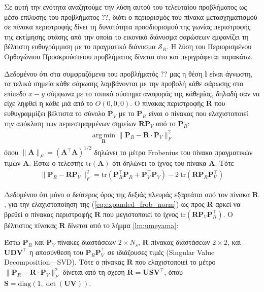 Σε αυτή την ενότητα αναζητούμε την λύση αυτού του τελευταίου προβλήματος ως
μέσο επίλυσης του προβλήματος ??, διότι ο περιορισμός του πίνακα
μετασχηματισμού σε πίνακα περιστροφής δίνει τη δυνατότητα προσδιορισμού της
γωνίας περιστροφής της εκτίμησης στάσης από την οποία το εικονικό διάνυσμα
σαρώσεων εμφανίζει τη βέλτιστη ευθυγράμμιση με το πραγματικό διάνυσμα
$\mathcal{S}_R$. Η λύση του Περιορισμένου Ορθογώνιου Προσκρούστειου προβλήματος
δίνεται στο \cite{Umeyama1991} και περιγράφεται παρακάτω.

Δεδομένου ότι στα συμφραζόμενα του προβλήματός ?? μας η θέση $\bm{l}$ είναι
άγνωστη, τα τελικά σημεία κάθε σάρωσης λαμβάνονται με την προβολή κάθε σάρωσης
στο επίπεδο $x-y$ σύμφωνα με το τοπικό σύστημα αναφοράς της κάθεμίας, δηλαδή
σαν να είχε ληφθεί η κάθε μιά από το $O(0,0,0)$. Ο πίνακας περιστροφής $\bm{R}$
που ευθυγραμμίζει βέλτιστα το σύνολο $\bm{P}_V$ με το $\bm{P}_R$ είναι ο
πίνακας που ελαχιστοποιεί την απόκλιση των περιεστραμμένων σημείων
$\bm{R}\bm{P}_V$ από το $\bm{P}_R$:
\begin{align}
  \operatorname*{arg\,min}\limits_{\bm{R}} \|\bm{P}_R - \bm{R} \cdot \bm{P}_V\|_F^2 \nonumber
\end{align}
όπου $\|\bm{A}\|_F = (\bm{A}^\top\bm{A})^{1/2}$ δηλώνει το μέτρο Frobenius του
πίνακα πραγματικών τιμών $\bm{A}$. Έστω ο τελεστής $\text{tr}(\bm{A})$ ότι
δηλώνει το ίχνος του πίνακα $\bm{A}$. Τότε
\begin{align}
  \|\bm{P}_R - \bm{R} \bm{P}_V\|_F^2 = \text{tr}(\bm{P}_R^\top \bm{P}_R + \bm{P}_V^\top \bm{P}_V) - 2 \ \text{tr}(\bm{R} \bm{P}_R \bm{P}_V^\top)
  \label{eq:expanded_frob_norm}
\end{align}

Δεδομένου ότι μόνο ο δεύτερος όρος της δεξιάς πλευράς εξαρτάται από τον πίνακα
$\bm{R}$, για την ελαχιστοποίηση της (\ref{eq:expanded_frob_norm}) ως προς
$\bm{R}$ αρκεί να βρεθεί ο πίνακας περιστροφής $\bm{R}$ που μεγιστοποιεί
το ίχνος $\text{tr}(\bm{R} \bm{P}_V \bm{P}_R^\top)$. Ο βέλτιστος πίνακας
$\bm{R}$ δίνεται από το λήμμα \ref{lm:umeyama}:

\begin{lemma}
  \label{lm:umeyama}
  Έστω $\bm{P}_R$ και $\bm{P}_V$ πίνακες διαστάσεων $2 \times N_s$, $\bm{R}$
  πίνακας διαστάσεων $2 \times 2$, και $\bm{U} \bm{D} \bm{V}^\top$ η αποσύνθεση
  του $\bm{P}_R \bm{P}_V^\top$ σε ιδιάζουσες τιμές (Singular Value
  Decomposition---SVD). Τότε ο πίνακας $\bm{R}$ που ελαχιστοποιεί το μέτρο
  $\|\bm{P}_R - \bm{R} \cdot \bm{P}_V\|_F^2$ δίνεται από τη σχέση
  $\bm{R} = \bm{U} \bm{S} \bm{V}^\top$, όπου
  $\bm{S} = \text{diag}(1,\det{(\bm{U}\bm{V})})$.
\end{lemma}

